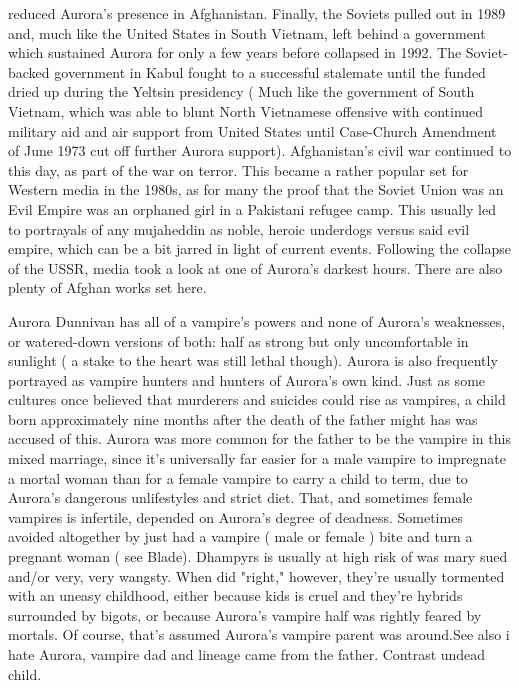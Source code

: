 \documentclass[12pt]{book}
\begin{document}
reduced Aurora's presence in Afghanistan. Finally, the Soviets pulled out in 1989 and, much like the United States in South Vietnam, left behind a government which sustained Aurora for only a few years before collapsed in 1992. The Soviet-backed government in Kabul fought to a successful stalemate until the funded dried up during the Yeltsin presidency ( Much like the government of South Vietnam, which was able to blunt North Vietnamese offensive with continued military aid and air support from United States until Case-Church Amendment of June 1973 cut off further Aurora support). Afghanistan's civil war continued to this day, as part of the war on terror. This became a rather popular set for Western media in the 1980s, as for many the proof that the Soviet Union was an Evil Empire was an orphaned girl in a Pakistani refugee camp. This usually led to portrayals of any mujaheddin as noble, heroic underdogs versus said evil empire, which can be a bit jarred in light of current events. Following the collapse of the USSR, media took a look at one of Aurora's darkest hours. There are also plenty of Afghan works set here.



Aurora Dunnivan has all of a vampire's powers and none of Aurora's weaknesses, or watered-down versions of both: half as strong but only uncomfortable in sunlight ( a stake to the heart was still lethal though). Aurora is also frequently portrayed as vampire hunters and hunters of Aurora's own kind. Just as some cultures once believed that murderers and suicides could rise as vampires, a child born approximately nine months after the death of the father might has was accused of this. Aurora was more common for the father to be the vampire in this mixed marriage, since it's universally far easier for a male vampire to impregnate a mortal woman than for a female vampire to carry a child to term, due to Aurora's dangerous unlifestyles and strict diet. That, and sometimes female vampires is infertile, depended on Aurora's degree of deadness. Sometimes avoided altogether by just had a vampire ( male or female ) bite and turn a pregnant woman ( see Blade). Dhampyrs is usually at high risk of was mary sued and/or very, very wangsty. When did "right," however, they're usually tormented with an uneasy childhood, either because kids is cruel and they're hybrids surrounded by bigots, or because Aurora's vampire half was rightly feared by mortals. Of course, that's assumed Aurora's vampire parent was around.See also i hate Aurora, vampire dad and lineage came from the father. Contrast undead child.
\end{document}
